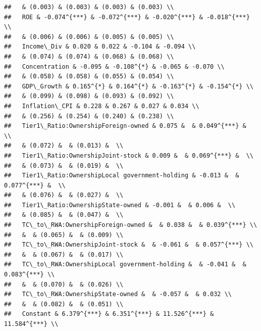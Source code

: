 \documentclass{article}
\begin{document}
\begin{verbatim}
##   & (0.003) & (0.003) & (0.003) & (0.003) \\ 
##   ROE & -0.074^{***} & -0.072^{***} & -0.020^{***} & -0.018^{***} \\ 
##   & (0.006) & (0.006) & (0.005) & (0.005) \\ 
##   Income\_Div & 0.020 & 0.022 & -0.104 & -0.094 \\ 
##   & (0.074) & (0.074) & (0.068) & (0.068) \\ 
##   Concentration & -0.095 & -0.108^{*} & -0.065 & -0.070 \\ 
##   & (0.058) & (0.058) & (0.055) & (0.054) \\ 
##   GDP\_Growth & 0.165^{*} & 0.164^{*} & -0.163^{*} & -0.154^{*} \\ 
##   & (0.099) & (0.098) & (0.093) & (0.092) \\ 
##   Inflation\_CPI & 0.228 & 0.267 & 0.027 & 0.034 \\ 
##   & (0.256) & (0.254) & (0.240) & (0.238) \\ 
##   Tier1\_Ratio:OwnershipForeign-owned & 0.075 &  & 0.049^{***} &  \\ 
##   & (0.072) &  & (0.013) &  \\ 
##   Tier1\_Ratio:OwnershipJoint-stock & 0.009 &  & 0.069^{***} &  \\ 
##   & (0.073) &  & (0.019) &  \\ 
##   Tier1\_Ratio:OwnershipLocal government-holding & -0.013 &  & 0.077^{***} &  \\ 
##   & (0.076) &  & (0.027) &  \\ 
##   Tier1\_Ratio:OwnershipState-owned & -0.001 &  & 0.006 &  \\ 
##   & (0.085) &  & (0.047) &  \\ 
##   TC\_to\_RWA:OwnershipForeign-owned &  & 0.038 &  & 0.039^{***} \\ 
##   &  & (0.065) &  & (0.009) \\ 
##   TC\_to\_RWA:OwnershipJoint-stock &  & -0.061 &  & 0.057^{***} \\ 
##   &  & (0.067) &  & (0.017) \\ 
##   TC\_to\_RWA:OwnershipLocal government-holding &  & -0.041 &  & 0.083^{***} \\ 
##   &  & (0.070) &  & (0.026) \\ 
##   TC\_to\_RWA:OwnershipState-owned &  & -0.057 &  & 0.032 \\ 
##   &  & (0.082) &  & (0.051) \\ 
##   Constant & 6.379^{***} & 6.351^{***} & 11.526^{***} & 11.584^{***} \\ 

\end{verbatim}
\end{document}

